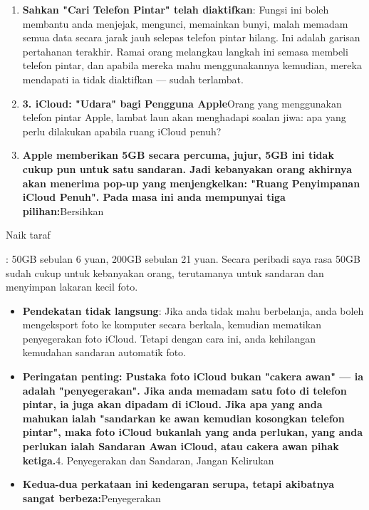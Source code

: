 
\begin{enumerate}
  \item \textbf{Sahkan "Cari Telefon Pintar" telah diaktifkan}: Fungsi ini boleh membantu anda menjejak, mengunci, memainkan bunyi, malah memadam semua data secara jarak jauh selepas telefon pintar hilang. Ini adalah garisan pertahanan terakhir. Ramai orang melangkau langkah ini semasa membeli telefon pintar, dan apabila mereka mahu menggunakannya kemudian, mereka mendapati ia tidak diaktifkan — sudah terlambat.
  \item \textbf{3. iCloud: "Udara" bagi Pengguna Apple}Orang yang menggunakan telefon pintar Apple, lambat laun akan menghadapi soalan jiwa: apa yang perlu dilakukan apabila ruang iCloud penuh?
  \item \textbf{Apple memberikan 5GB secara percuma, jujur, 5GB ini tidak cukup pun untuk satu sandaran. Jadi kebanyakan orang akhirnya akan menerima pop-up yang menjengkelkan: "Ruang Penyimpanan iCloud Penuh". Pada masa ini anda mempunyai tiga pilihan:}Bersihkan
\end{enumerate}


Naik taraf

: 50GB sebulan 6 yuan, 200GB sebulan 21 yuan. Secara peribadi saya rasa 50GB sudah cukup untuk kebanyakan orang, terutamanya untuk sandaran dan menyimpan lakaran kecil foto.

\begin{itemize}
  \item \textbf{Pendekatan tidak langsung}: Jika anda tidak mahu berbelanja, anda boleh mengeksport foto ke komputer secara berkala, kemudian mematikan penyegerakan foto iCloud. Tetapi dengan cara ini, anda kehilangan kemudahan sandaran automatik foto.
  \item \textbf{Peringatan penting: Pustaka foto iCloud bukan "cakera awan" — ia adalah "penyegerakan". Jika anda memadam satu foto di telefon pintar, ia juga akan dipadam di iCloud. Jika apa yang anda mahukan ialah "sandarkan ke awan kemudian kosongkan telefon pintar", maka foto iCloud bukanlah yang anda perlukan, yang anda perlukan ialah Sandaran Awan iCloud, atau cakera awan pihak ketiga.}4. Penyegerakan dan Sandaran, Jangan Kelirukan
  \item \textbf{Kedua-dua perkataan ini kedengaran serupa, tetapi akibatnya sangat berbeza:}Penyegerakan
\end{itemize}

